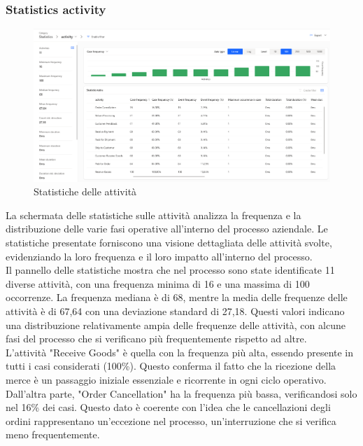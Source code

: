 \documentclass{article}
\begin{document}
\subsubsection{Statistics activity}
\begin{figure}[H]
    \centering
    \includegraphics[width=\textwidth]{imgMicrosoft/PrimaSimulazione/StatisticsActivitySimulazione1.png}
    \caption{Statistiche delle attività}
    \label{fig:statistics-activity}
\end{figure}
La schermata delle statistiche sulle attività analizza la frequenza e la distribuzione delle varie fasi operative all'interno del processo aziendale. Le statistiche presentate forniscono una visione dettagliata delle attività svolte, evidenziando la loro frequenza e il loro impatto all'interno del processo.\\
Il pannello delle statistiche mostra che nel processo sono state identificate 11 diverse attività, con una frequenza minima di 16 e una massima di 100 occorrenze. La frequenza mediana è di 68, mentre la media delle frequenze delle attività è di 67,64 con una deviazione standard di 27,18. Questi valori indicano una distribuzione relativamente ampia delle frequenze delle attività, con alcune fasi del processo che si verificano più frequentemente rispetto ad altre.\\
L'attività "Receive Goods" è quella con la frequenza più alta, essendo presente in tutti i casi considerati (100\%). Questo conferma il fatto che la ricezione della merce è un passaggio iniziale essenziale e ricorrente in ogni ciclo operativo.\\
Dall'altra parte, "Order Cancellation" ha la frequenza più bassa, verificandosi solo nel 16\% dei casi. Questo dato è coerente con l'idea che le cancellazioni degli ordini rappresentano un'eccezione nel processo, un'interruzione che si verifica meno frequentemente.\\
\end{document}
